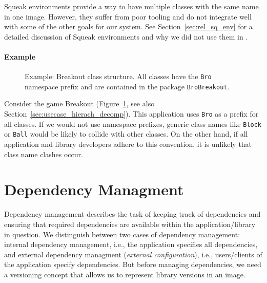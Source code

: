 Squeak environments provide a way to have multiple classes with the same name in one image. However, they suffer from poor tooling and do not integrate well with some of the other goals for our system. See Section~\ref{sec:rel_sq_env} for a detailed discussion of Squeak environments and why we did not use them in \msname.

\paragraph{Example}
\begin{figure}[!htp]
\caption[Example: Breakout class structure]{Example: Breakout class structure. All classes have the \texttt{Bro} namespace prefix and are contained in the package \texttt{BroBreakout}.}
\label{fig:conc_breakout}
\end{figure}

Consider the game Breakout (Figure~\ref{fig:conc_breakout}, see also Section~\ref{sec:usecase_hierach_decomp}). This application uses \texttt{Bro} as a prefix for all classes. If we would not use namespace prefixes, generic class names like \texttt{Block} or \texttt{Ball} would be likely to collide with other classes. On the other hand, if all application and library developers adhere to this convention, it is unlikely that class name clashes occur.

\section{Dependency Managment}
Dependency management describes the task of keeping track of dependencies and ensuring that required dependencies are available within the application/library in question. We distinguish between two cases of dependency management: internal dependency management, i.e., the application specifies all dependencies, and external dependency managment (\emph{external configuration}), i.e., users/clients of the application specify dependencies. But before managing dependencies, we need a versioning concept that allows us to represent library versions in an image.

